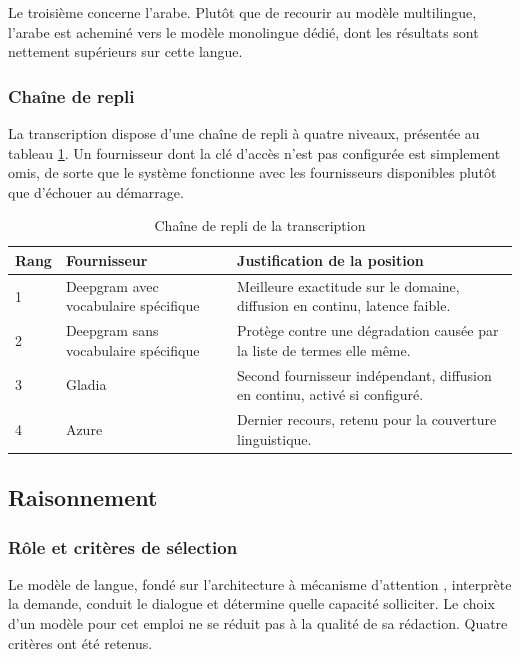 Le troisième concerne l'arabe. Plutôt que de recourir au modèle multilingue, l'arabe est acheminé vers le modèle monolingue dédié, dont les résultats sont nettement supérieurs sur cette langue.

\subsubsection{Chaîne de repli}

La transcription dispose d'une chaîne de repli à quatre niveaux, présentée au tableau \ref{tab:stt-chaine}. Un fournisseur dont la clé d'accès n'est pas configurée est simplement omis, de sorte que le système fonctionne avec les fournisseurs disponibles plutôt que d'échouer au démarrage.

\begin{table}[H]
\centering
\renewcommand{\arraystretch}{1.25}
\begin{tabular}{|p{1.2cm}|p{3.6cm}|p{9.7cm}|}
\hline
\textbf{Rang} & \textbf{Fournisseur} & \textbf{Justification de la position} \\
\hline
1 & Deepgram avec vocabulaire spécifique & Meilleure exactitude sur le domaine, diffusion en continu, latence faible. \\
\hline
2 & Deepgram sans vocabulaire spécifique & Protège contre une dégradation causée par la liste de termes elle même. \\
\hline
3 & Gladia & Second fournisseur indépendant, diffusion en continu, activé si configuré. \\
\hline
4 & Azure & Dernier recours, retenu pour la couverture linguistique. \\
\hline
\end{tabular}
\caption{Chaîne de repli de la transcription}
\label{tab:stt-chaine}
\end{table}

\subsection{Raisonnement}

\subsubsection{Rôle et critères de sélection}

Le modèle de langue, fondé sur l'architecture à mécanisme d'attention \cite{vaswani}, interprète la demande, conduit le dialogue et détermine quelle capacité solliciter. Le choix d'un modèle pour cet emploi ne se réduit pas à la qualité de sa rédaction. Quatre critères ont été retenus.

